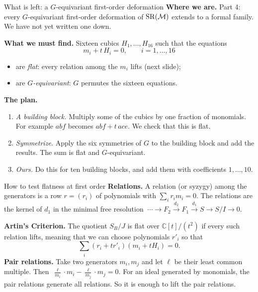 \begin{frame}{What is left: a \(G\)-equivariant first-order deformation}
\textbf{Where we are.} Part 4: every \(G\)-equivariant first-order deformation of \(\operatorname{SR}(\mathcal M)\) extends to a formal family. We have not yet written one down.
\par
\textbf{What we must find.} Sixteen cubics \(H_1,\dots,H_{16}\) such that the equations
\[
\boxed{m_i+t\,H_i=0,\qquad i=1,\dots,16}
\]
\begin{itemize}
\setlength{\itemsep}{1pt}
\item are \emph{flat}: every relation among the \(m_i\) lifts (next slide);
\item are \emph{\(G\)-equivariant}: \(G\) permutes the sixteen equations.
\end{itemize}
\textbf{The plan.}
\begin{enumerate}
\setlength{\itemsep}{1pt}
\item \emph{A building block.} Multiply some of the cubics by one fraction of monomials. For example \(abf\) becomes \(abf+t\,ace\). We check that this is flat.
\item \emph{Symmetrize.} Apply the six symmetries of \(G\) to the building block and add the results. The sum is flat and \(G\)-equivariant.
\item \emph{Ours.} Do this for ten building blocks, and add them with coefficients \(1,\dots,10\).
\end{enumerate}
\end{frame}

\begin{frame}{How to test flatness at first order}
\textbf{Relations.} A relation (or syzygy) among the generators is a row \(r=(r_i)\) of polynomials with \(\sum_i r_im_i=0\). The relations are the kernel of \(d_1\) in the minimal free resolution
\(\ \cdots\to F_2\xrightarrow{d_2}F_1\xrightarrow{d_1}S\to S/I\to0\).
\par
\textbf{Artin's Criterion.} The quotient \(S_B/J\) is flat over \(\mathbb C[t]/(t^2)\)
if every such relation lifts, meaning that we can choose
polynomials \(r'_i\) so that
\[
\sum_i(r_i+t r'_i)(m_i+tH_i)=0.
\]
\textbf{Pair relations.} Take two generators \(m_i,m_j\) and let \(\ell\) be their least common multiple. Then \(\ \frac{\ell}{m_i}\cdot m_i-\frac{\ell}{m_j}\cdot m_j=0\).
For an ideal generated by monomials, the pair relations generate all relations. So it is enough to lift the pair relations.
\end{frame}

